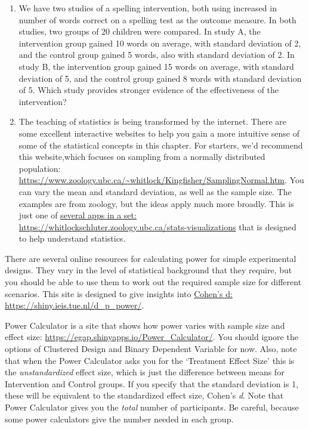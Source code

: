 \documentclass{krantz}
\begin{document}
\begin{enumerate}
\def\labelenumi{\arabic{enumi}.}
\item
  We have two studies of a spelling intervention, both using increased in number of words correct on a spelling test as the outcome measure. In both studies, two groups of 20 children were compared. In study A, the intervention group gained 10 words on average, with standard deviation of 2, and the control group gained 5 words, also with standard deviation of 2. In study B, the intervention group gained 15 words on average, with standard deviation of 5, and the control group gained 8 words with standard deviation of 5. Which study provides stronger evidence of the effectiveness of the intervention?
\item
  The teaching of statistics is being transformed by the internet. There are some excellent interactive websites to help you gain a more intuitive sense of some of the statistical concepts in this chapter. For starters, we'd recommend this website,which focuses on sampling from a normally distributed population: \url{https://www.zoology.ubc.ca/~whitlock/Kingfisher/SamplingNormal.htm}. You can vary the mean and standard deviation, as well as the sample size. The examples are from zoology, but the ideas apply much more broadly. This is just one of \href{https://whitlockschluter.zoology.ubc.ca/stats-visualizations}{several apps in a set: https://whitlockschluter.zoology.ubc.ca/stats-visualizations} that is designed to help understand statistics.
\end{enumerate}

There are several online resources for calculating power for simple experimental designs. They vary in the level of statistical background that they require, but you should be able to use them to work out the required sample size for different scenarios. This site is designed to give insights into \href{https://shiny.ieis.tue.nl/d_p_power/}{Cohen's d: https://shiny.ieis.tue.nl/d\_p\_power/}.

Power Calculator is a site that shows how power varies with sample size and effect size: \url{https://egap.shinyapps.io/Power_Calculator/}. You should ignore the options of Clustered Design and Binary Dependent Variable for now. Also, note that when the Power Calculator asks you for the `Treatment Effect Size' this is the \emph{unstandardized} effect size, which is just the difference between means for Intervention and Control groups. If you specify that the standard deviation is 1, these will be equivalent to the standardized effect size, Cohen's \emph{d}. Note that Power Calculator gives you the \emph{total} number of participants. Be careful, because some power calculators give the number needed in each group.
\end{document}
